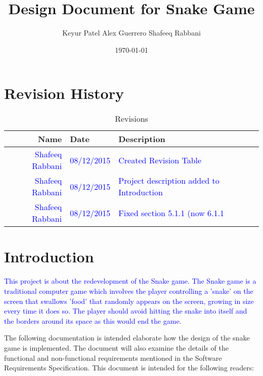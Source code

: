 \documentclass[12pt]{article}
\begin{document}
\title{Design Document for Snake Game} 
\author{Keyur Patel
Alex Guerrero
Shafeeq Rabbani}
\date{\today}
	
\maketitle

\tableofcontents

\newpage

\section{Revision History}

\begin{center}
	\begin{longtable}{ | r | p{4cm} | p{10cm} | p{4cm} |}
	\caption{Revisions} \\ \hline \label{TblInputVar} 
	Name & Date & Description\\ \hline
	\textcolor{blue}{Shafeeq Rabbani} & \textcolor{blue}{08/12/2015} &  \textcolor{blue}{Created Revision Table}\\\hline
	\textcolor{blue}{Shafeeq Rabbani} & \textcolor{blue}{08/12/2015} &  \textcolor{blue}{Project description added to Introduction}\\ \hline
	\textcolor{blue}{Shafeeq Rabbani} & \textcolor{blue}{08/12/2015} &  \textcolor{blue}{Fixed section 5.1.1 (now 6.1.1}\\ 
	\end{longtable}
\end{center}

\section{Introduction}
\textcolor{blue}{This project is about the redevelopment of the Snake game. The Snake game is a traditional computer game which involves the player controlling a 'snake' on the screen that swallows 'food' that randomly appears on the screen, growing in size every time it does so. The player should avoid hitting the snake into itself and the borders around its space as this would end the game. }


The following documentation is intended elaborate how the design of the snake game is implemented. The document will also examine the details of the functional and non-functional requirements mentioned in the Software Requirements Specification. This document is intended for the following readers:
\end{document}
